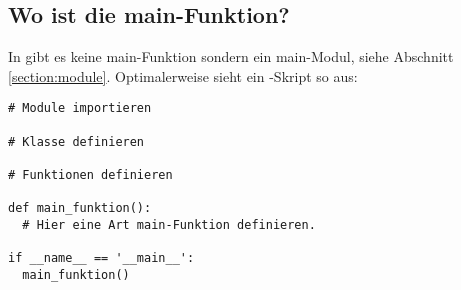 \subsection{Wo ist die main-Funktion?}
\label{section:funktionen:wo_ist_die_main_funktion}
In \Python gibt es keine main-Funktion sondern ein main-Modul, siehe Abschnitt \ref{section:module}.
Optimalerweise sieht ein \Python-Skript so aus:
\begin{lstlisting}
# Module importieren

# Klasse definieren

# Funktionen definieren

def main_funktion():
  # Hier eine Art main-Funktion definieren.

if __name__ == '__main__':
  main_funktion()
\end{lstlisting}

